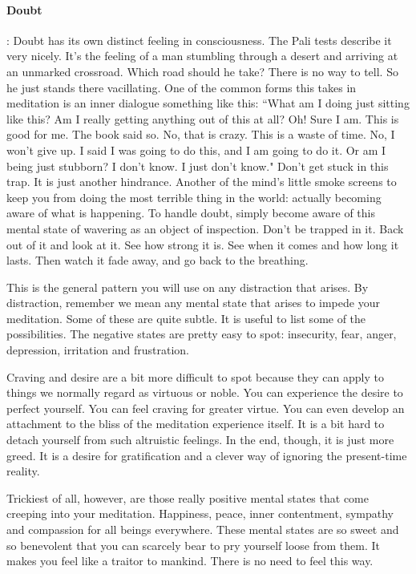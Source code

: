 \paragraph*{Doubt}: Doubt has its own distinct feeling in consciousness. The Pali tests
describe it very nicely. It's the feeling of a man stumbling through a desert
and arriving at an unmarked crossroad. Which road should he take? There is no
way to tell. So he just stands there vacillating. One of the common forms this
takes in meditation is an inner dialogue something like this: ``What am I doing
just sitting like this? Am I really getting anything out of this at all? Oh!
Sure I am. This is good for me. The book said so. No, that is crazy. This is a
waste of time. No, I won't give up. I said I was going to do this, and I am
going to do it. Or am I being just stubborn? I don't know. I just don't know."
Don't get stuck in this trap. It is just another hindrance. Another of the
mind's little smoke screens to keep you from doing the most terrible thing in
the world: actually becoming aware of what is happening. To handle doubt, simply
become aware of this mental state of wavering as an object of inspection. Don't
be trapped in it. Back out of it and look at it. See how strong it is. See when
it comes and how long it lasts. Then watch it fade away, and go back to the
breathing.

This is the general pattern you will use on any distraction that arises. By
distraction, remember we mean any mental state that arises to impede your
meditation. Some of these are quite subtle. It is useful to list some of the
possibilities. The negative states are pretty easy to spot: insecurity, fear,
anger, depression, irritation and frustration.

Craving and desire are a bit more difficult to spot because they can apply to
things we normally regard as virtuous or noble. You can experience the desire to
perfect yourself. You can feel craving for greater virtue. You can even develop
an attachment to the bliss of the meditation experience itself. It is a bit hard
to detach yourself from such altruistic feelings. In the end, though, it is just
more greed. It is a desire for gratification and a clever way of ignoring the
present-time reality.

Trickiest of all, however, are those really positive mental states that come creeping into your meditation. Happiness, peace, inner
contentment, sympathy and compassion for all beings everywhere. These mental states are so sweet and so benevolent that you
can scarcely bear to pry yourself loose from them. It makes you feel like a traitor to mankind. There is no need to feel this way.

